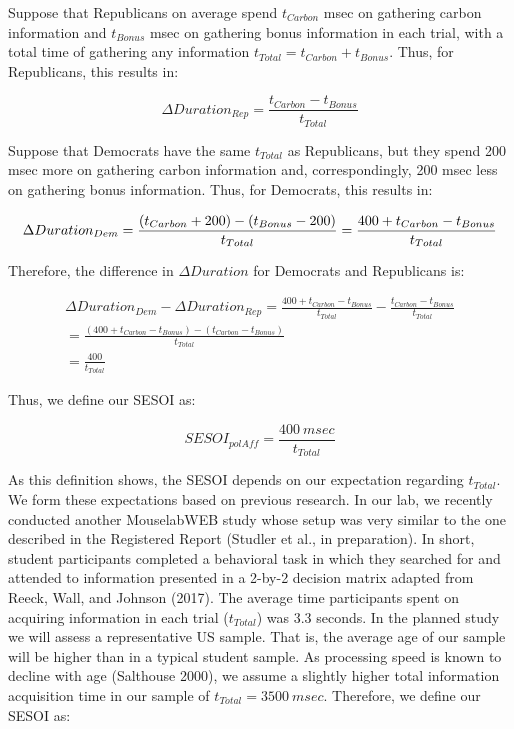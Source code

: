 \documentclass[
  letterpaper,
  DIV=11,
  numbers=noendperiod]{scrartcl}
\begin{document}
Suppose that Republicans on average spend \(t_{Carbon}\) msec on
gathering carbon information and \(t_{Bonus}\) msec on gathering bonus
information in each trial, with a total time of gathering any
information \(t_{Total} = t_{Carbon} + t_{Bonus}\). Thus, for
Republicans, this results in:

\[
\Delta Duration_{Rep} = \frac{t_{Carbon} - t_{Bonus}}{t_{Total}}
\]

Suppose that Democrats have the same \(t_{Total}\) as Republicans, but
they spend 200 msec more on gathering carbon information and,
correspondingly, 200 msec less on gathering bonus information. Thus, for
Democrats, this results in:

\[
\Delta Duration_{Dem} = \frac{(t_{Carbon} + 200) - (t_{Bonus} - 200)}{t_{Total}} \\
                      = \frac{400 + t_{Carbon} - t_{Bonus}}{t_{Total}}
\]

Therefore, the difference in \(\Delta Duration\) for Democrats and
Republicans is:

\[
\begin{split}
\Delta Duration_{Dem} - \Delta Duration_{Rep} = \frac{400 + t_{Carbon} - t_{Bonus}}{t_{Total}} -  \frac{t_{Carbon} - t_{Bonus}}{t_{Total}} \\
  = \frac {(400 + t_{Carbon} - t_{Bonus}) - (t_{Carbon} - t_{Bonus})}{t_{Total}} \\
  = \frac {400}{t_{Total}}
\end{split}
\]

Thus, we define our SESOI as:

\[SESOI_{polAff} = \frac{400\ msec}{t_{Total}}\]

As this definition shows, the SESOI depends on our expectation regarding
\(t_{Total}\). We form these expectations based on previous research. In
our lab, we recently conducted another MouselabWEB study whose setup was
very similar to the one described in the Registered Report (Studler et
al., in preparation). In short, student participants completed a
behavioral task in which they searched for and attended to information
presented in a 2-by-2 decision matrix adapted from Reeck, Wall, and
Johnson (2017). The average time participants spent on acquiring
information in each trial (\(t_{Total}\)) was 3.3 seconds. In the
planned study we will assess a representative US sample. That is, the
average age of our sample will be higher than in a typical student
sample. As processing speed is known to decline with age (Salthouse
2000), we assume a slightly higher total information acquisition time in
our sample of \(t_{Total} = 3500\ msec\). Therefore, we define our SESOI
as:
\end{document}
